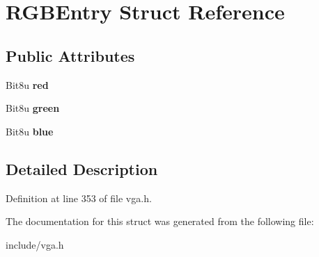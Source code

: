 \hypertarget{structRGBEntry}{\section{R\-G\-B\-Entry Struct Reference}
\label{structRGBEntry}
}
\subsection*{Public Attributes}
\begin{DoxyCompactItemize}
\item 
\hypertarget{structRGBEntry_a51c517e90d0d1bab872e5fdee34a60bc}{Bit8u {\bfseries red}}\label{structRGBEntry_a51c517e90d0d1bab872e5fdee34a60bc}

\item 
\hypertarget{structRGBEntry_adc6713003c2ad77cc873d56e74135362}{Bit8u {\bfseries green}}\label{structRGBEntry_adc6713003c2ad77cc873d56e74135362}

\item 
\hypertarget{structRGBEntry_a96944c8a46f4ae70ec99e8e33d117627}{Bit8u {\bfseries blue}}\label{structRGBEntry_a96944c8a46f4ae70ec99e8e33d117627}

\end{DoxyCompactItemize}


\subsection{Detailed Description}


Definition at line 353 of file vga.\-h.



The documentation for this struct was generated from the following file\-:\begin{DoxyCompactItemize}
\item 
include/vga.\-h\end{DoxyCompactItemize}
